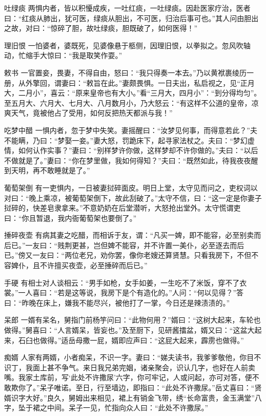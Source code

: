 \documentclass[12pt,UTF8]{ctexbook}
\begin{document}
吐绿痰
两惧内者，皆以积懮成疾，一吐红痰，一吐绿痰。因赴医家疗治，医者曰：“红痰从肺出，犹可医，绿痰从胆出，不可医，归治后事可也。”其人问由胆出之故，对曰：“惊碎了胆，故吐绿痰，胆既破了，如何医得！”

理旧恨
一怕婆者，婆既死，见婆像悬于柩侧，因理旧恨，以拳拟之。忽风吹轴动，忙缩手大惊曰：“我是取笑作耍。”

敕书
一官置妾，畏妻，不得自由，怒曰：“我只得奏一本去。”乃以黄袱裹绫历一册，从外擎回，谓妻曰：“敕旨在此。”妻颇畏惧。一日夫出，私启视之，见“正月大，二月小”，喜云：“原来皇帝也有大小。”看“三月大，四月小”：“到分得均匀”。至五月大、六月大、七月大、八月数月小，乃大怒云：“有这样不公道的皇帝，凉爽天气，竟被他占了受用，如何反把热天都派与我！”

吃梦中醋
一惧内者，忽于梦中失笑。妻摇醒曰：“汝梦见何事，而得意若此？”夫不能瞒，乃曰：“梦娶一妾。”妻大怒，罚跪床下，起寻家法杖之。夫曰：“梦幻虚情，如何认作实事？”妻曰：“别样梦许你做，这样梦却不许你做的。”夫曰：“以后不做就是了。”妻曰：“你在梦里做，我如何得知？”夫曰：“既然如此，待我夜夜醒到天明，再不敢睡就是了。”

葡萄架倒
有一吏惧内，一日被妻挝碎面皮。明日上堂，太守见而问之，吏权词以对曰：“晚上乘凉，被葡萄架倒下，故此刮破了。”太守不信，曰：“这一定是你妻子挝碎的，快差皂隶拿来。”不意奶奶在后堂潜听，大怒抢出堂外。太守慌谓吏曰：“你且暂退，我内衙葡萄架也要倒了。”

捶碎夜壶
有病其妻之吃醋，而相诉于友，谓：“凡买一婢，即不能容，必至别卖而后已。”一友曰：“贱荆更甚，岂但婢不能容，并不许置一美仆，必至逐去而后已。”傍又一友曰：“两位老兄，劝你罢，像你老嫂还算贤慧。只看我房下，不但不容婢仆，且不许擅买夜壶，必至捶碎而后已。”

手硬
有相士对人谈相云：“男手如枪，女手如姜，一生吃不了米饭，穿不了衣裳。”一人喜曰：“若是这等说，我房下是个有造化的。”人问：“何以见得？”答曰：“昨晚在床上，嫌我不能尽兴，被他打了一掌，今日还是辣渍渍的。”

呆郎
一婿有呆名，舅指门前杨竽问曰：“此物何用？”婿曰：“这树大起来，车轮也做得。”舅喜曰：“人言婿呆，皆妄也。”及至厨下，见研酱擂盆，婿又曰：“这盆大起来，石臼也做得。”适岳母撒一屁，婿即应声曰：“这屁大起来，霹雳也做得。”

痴婿
人家有两婿，小者痴呆，不识一字。妻曰：“娣夫读书，我爹爹敬他，你目不识丁，我面上甚不争气。来日我兄弟完姻，诸亲聚会，识认几字，也好在人前卖嘴。我家土库前，写‘此处不许撒尿’六字，你可牢记，人或问起，亦可对答，便不敢欺你了。”呆子唯诺。至日，行至墙边，即指曰：“此处不许撒尿。”岳丈喜曰：“贤婿识字大好。”良久，舅姆出来相见，裙上有销金飞带，绣“长命富贵，金玉满堂”八字，坠于裙之中间。呆子一见，忙指向众人曰：“此处不许撒尿。”
\end{document}
